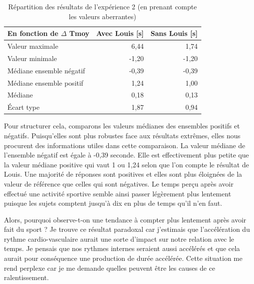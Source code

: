 \documentclass[12pt,fleqn,oneside,french,openany]{book} %
\begin{document}
\begin{table}[h!]
	\centering
	\caption{Répartition des résultats de l'expérience 2 (en prenant compte les valeurs aberrantes)} \label{tbl:analyse2.2}
	\begin{tabular}{lrr}
		\toprule 
		\textbf{En fonction de $\Delta$ Tmoy} & \textbf{Avec Louis [s]} & \textbf{Sans Louis [s]} \\ \midrule
		Valeur maximale & 6,44 & 1,74 \\
		Valeur minimale & -1,20 & -1,20 \\
		Médiane ensemble négatif & -0,39 & -0,39 \\
		Médiane ensemble positif & 1,24 & 1,00 \\
		Médiane & 0,18 & 0,13 \\
		\'Ecart type & 1,87 & 0,94 \\ \bottomrule
	\end{tabular}
\end{table}

Pour structurer cela, comparons les valeurs médianes des ensembles positifs et négatifs. Puisqu'elles sont plus robustes face aux résultats extrêmes, elles nous procurent des informations utiles dans cette comparaison. La valeur médiane de l'ensemble négatif est égale à -0,39 seconde. Elle est effectivement plus petite que la valeur médiane positive qui vaut 1 ou 1,24 selon que l'on compte le résultat de Louis. Une majorité de réponses sont positives et elles sont plus éloignées de la valeur de référence que celles qui sont négatives. Le temps perçu après avoir effectué une activité sportive semble ainsi passer légèrement plus lentement puisque les sujets comptent jusqu'à dix en plus de temps qu'il n'en faut. 

Alors, pourquoi observe-t-on une tendance à compter plus lentement après avoir fait du sport ? Je trouve ce résultat paradoxal car j'estimais que l'accélération du rythme cardio-vasculaire aurait une sorte d'impact sur notre relation avec le temps. Je pensais que nos rythmes internes seraient aussi accélérés et que cela aurait pour conséquence une production de durée accélérée. Cette situation me rend perplexe car je me demande quelles peuvent être les causes de ce ralentissement.
\end{document}
